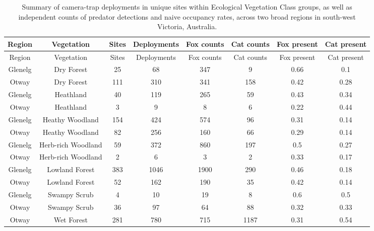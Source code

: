 \documentclass[]{elsarticle} %
\begin{document}
\begin{longtable}[]{@{}cccccccc@{}}
\caption{Summary of camera-trap deployments in unique sites within Ecological Vegetation Class groups, as well as independent counts of predator detections and naive occupancy rates, across two broad regions in south-west Victoria, Australia.}\tabularnewline
\toprule
Region & Vegetation & Sites & Deployments & Fox counts & Cat counts & Fox present & Cat present\tabularnewline
\midrule
\endfirsthead
\toprule
Region & Vegetation & Sites & Deployments & Fox counts & Cat counts & Fox present & Cat present\tabularnewline
\midrule
\endhead
Glenelg & Dry Forest & 25 & 68 & 347 & 9 & 0.66 & 0.1\tabularnewline
Otway & Dry Forest & 111 & 310 & 341 & 158 & 0.42 & 0.28\tabularnewline
Glenelg & Heathland & 40 & 119 & 265 & 59 & 0.43 & 0.34\tabularnewline
Otway & Heathland & 3 & 9 & 8 & 6 & 0.22 & 0.44\tabularnewline
Glenelg & Heathy Woodland & 154 & 424 & 574 & 96 & 0.31 & 0.14\tabularnewline
Otway & Heathy Woodland & 82 & 256 & 160 & 66 & 0.29 & 0.14\tabularnewline
Glenelg & Herb-rich Woodland & 59 & 372 & 860 & 197 & 0.5 & 0.27\tabularnewline
Otway & Herb-rich Woodland & 2 & 6 & 3 & 2 & 0.33 & 0.17\tabularnewline
Glenelg & Lowland Forest & 383 & 1046 & 1900 & 290 & 0.46 & 0.18\tabularnewline
Otway & Lowland Forest & 52 & 162 & 190 & 35 & 0.42 & 0.14\tabularnewline
Glenelg & Swampy Scrub & 4 & 10 & 19 & 8 & 0.6 & 0.5\tabularnewline
Otway & Swampy Scrub & 36 & 97 & 64 & 88 & 0.32 & 0.33\tabularnewline
Otway & Wet Forest & 281 & 780 & 715 & 1187 & 0.31 & 0.54\tabularnewline
\bottomrule
\end{longtable}

\newpage
\end{document}
